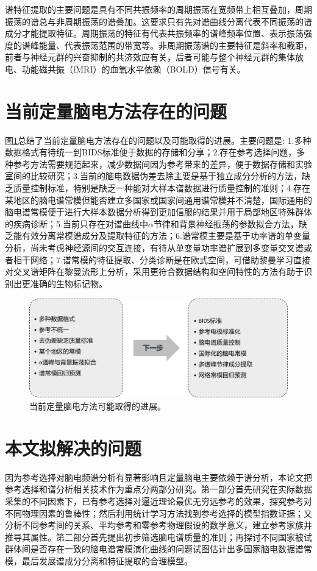 谱特征提取的主要问题是具有不同共振频率的周期振荡在宽频带上相互叠加，周期振荡的谱总与非周期振荡的谱叠加。这要求只有先对谱曲线分离代表不同振荡的谱成分才能提取特征。周期振荡的特征有代表共振频率的谱峰频率位置、表示振荡强度的谱峰能量、代表振荡范围的带宽等。非周期振荡谱的主要特征是斜率和截距，前者与神经元群的兴奋抑制的共济效应有关，后者可能与整个神经元群的集体放电、功能磁共振（fMRI）的血氧水平依赖（BOLD）信号有关。

\section{当前定量脑电方法存在的问题}
图\ref{1:qEEGnext}总结了当前定量脑电方法存在的问题以及可能取得的进展。主要问题是: 1.多种数据格式有待统一到BIDS标准便于数据的存储和分享；2.存在参考选择问题，多种参考方法需要规范起来，减少数据间因为参考带来的差异，便于数据存储和实验室间的比较研究；3.当前的脑电数据伪差去除主要是基于独立成分分析的方法，缺乏质量控制标准，特别是缺乏一种能对大样本谱数据进行质量控制的准则；4.存在某地区的脑电谱常模但能否建立多国家或国家间通用谱常模并不清楚，国际通用的脑电谱常模便于进行大样本数据分析得到更加信服的结果并用于局部地区特殊群体的疾病诊断；5.当前只存在对谱曲线中$\alpha$节律和背景神经振荡的参数拟合方法，缺乏能有效分离常模谱成分及提取特征的方法；6.谱常模主要是基于功率谱的单变量分析，尚未考虑神经源间的交互连接，有待从单变量功率谱扩展到多变量交叉谱或者相干网络；7.谱常模的特征提取、分类诊断是在欧式空间，可借助黎曼学习直接对交叉谱矩阵在黎曼流形上分析，采用更符合数据结构和空间特性的方法有助于识别出更准确的生物标记物。
\begin{figure}[!h]
	\includegraphics[width=12cm]{pic/xulun/qEEGnext.png}
	\caption{当前定量脑电方法可能取得的进展。}
	\label{1:qEEGnext}
\end{figure}

\section{本文拟解决的问题}
因为参考选择对脑电频谱分析有显著影响且定量脑电主要依赖于谱分析，本论文把参考选择和谱分析相关技术作为重点分两部分研究。第一部分首先研究在实际数据采集的不同因素下，已有参考选择对逼近理论最优无穷远参考的效果，探究参考对不同物理因素的鲁棒性；然后利用统计学习方法找到参考选择的模型指数证据；又分析不同参考间的关系、平均参考和零参考物理假设的数学意义，建立参考家族并推导其属性。第二部分首先提出初步筛选脑电谱质量的准则；再探讨不同国家被试群体间是否存在一致的脑电谱常模演化曲线的问题试图估计出多国家脑电数据谱常模，最后发展谱成分分离和特征提取的合理模型。

